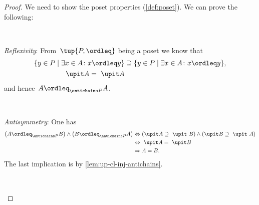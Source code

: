\begin{proof}
    We need to show the poset properties (\cref{def:poset}).
    We can prove the following:

    \

    \begin{compactitem}
        \item \emph{Reflexivity}: From~$\tup{P,\ordleq}$ being a poset we know that
        \begin{equation}
            \begin{aligned}
                \{y\in P \mid \exists x\in A \colon x\ordleq y\} &\supseteq \{y\in P \mid \exists x\in A \colon x\ordleq y\},\\
                \upit  A =\ \upit  A
            \end{aligned}
        \end{equation}
        and hence~$A\ordleq_{\antichains P}A$.

        \

        \item \emph{Antisymmetry}: One has
        \begin{equation}
            \begin{aligned}
                \left(A\ordleq_{\antichains P} B\right) \wedge \left(B\ordleq_{\antichains P} A\right)
                &\Leftrightarrow \left(\upit  A \supseteq \ \upit  \ B\right) \wedge \left( \upit   B\supseteq \ \upit  \ A\right)\\
                &\Leftrightarrow \ \upit  A= \ \upit  B \\
                & \Rightarrow A = B.
            \end{aligned}
        \end{equation}
        The last implication is by  \cref{lem:up-cl-inj-antichains}.

        \



\end{compactitem}
\end{proof}
